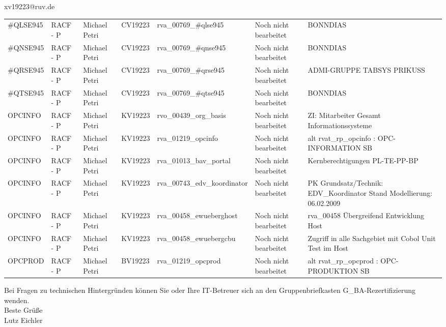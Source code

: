 \documentclass[a4paper,landscape,12pt]{letter}
\begin{document}
\begin{letter}{xv19223@ruv.de\hfill \break}
\begin{tiny}
\begin{longtable}{|p{35mm}|p{15mm}|p{25mm}|p{10mm}|p{40mm}|p{50mm}|p{50mm}|}
\#QLSE945 & RACF - P & Michael Petri & CV19223 & rva\_00769\_\#qlse945 & Noch nicht bearbeitet & BONNDIAS \\
\#QNSE945 & RACF - P & Michael Petri & CV19223 & rva\_00769\_\#qnse945 & Noch nicht bearbeitet & BONNDIAS \\
\#QRSE945 & RACF - P & Michael Petri & CV19223 & rva\_00769\_\#qrse945 & Noch nicht bearbeitet & ADMI-GRUPPE TABSYS PRIKUSS \\
\#QTSE945 & RACF - P & Michael Petri & CV19223 & rva\_00769\_\#qtse945 & Noch nicht bearbeitet & BONNDIAS \\
OPCINFO & RACF - P & Michael Petri & KV19223 & rvo\_00439\_org\_basis & Noch nicht bearbeitet & ZI: Mitarbeiter Gesamt Informationssysteme \\
OPCINFO & RACF - P & Michael Petri & KV19223 & rva\_01219\_opcinfo & Noch nicht bearbeitet & alt rvat\_rp\_opcinfo          : OPC- INFORMATION                         SB \\
OPCINFO & RACF - P & Michael Petri & KV19223 & rva\_01013\_bav\_portal & Noch nicht bearbeitet & Kernberechtigungen PL-TE-PP-BP \\
OPCINFO & RACF - P & Michael Petri & KV19223 & rva\_00743\_edv\_koordinator & Noch nicht bearbeitet & PK Grundsatz/Technik: EDV\_Koordinator Stand Modellierung: 06.02.2009 \\
OPCINFO & RACF - P & Michael Petri & KV19223 & rva\_00458\_ewueberghost & Noch nicht bearbeitet & rva\_00458 Übergreifend Entwicklung Host \\
OPCINFO & RACF - P & Michael Petri & KV19223 & rva\_00458\_ewuebergcbu & Noch nicht bearbeitet & Zugriff in alle Sachgebiet mit Cobol Unit Test im Host \\
OPCPROD & RACF - P & Michael Petri & BV19223 & rva\_01219\_opcprod & Noch nicht bearbeitet & alt rvat\_rp\_opcprod          : OPC-PRODUKTION                           SB \\

\hline
		\end{longtable}
		\end{tiny}
	
\begin{minipage}{\textwidth}
			Bei Fragen zu technischen Hintergründen können Sie 
			oder Ihre IT-Betreuer sich an den Gruppenbriefkasten 
			G\_BA-Rezertifizierung
			wenden.\\
			\linebreak
			Beste Grüße\\
			Lutz Eichler
	\end{minipage}
	\end{letter}
	
\end{document}
